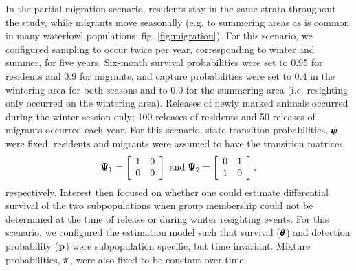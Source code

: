 \documentclass[times,mee,doublespace,]{besauth2}
\begin{document}
In the partial migration scenario, residents stay in the same strata throughout the study, while migrants move seasonally (e.g. to summering areas as is common in many waterfowl populations; fig. \ref{fig:migration}).  For this scenario, we configured sampling to occur twice per year, corresponding to winter and summer, for five years.  Six-month survival probabilities were set to 0.95 for residents and 0.9 for migrants, and capture probabilities were set to 0.4 in the wintering area for both seasons and to 0.0 for the summering area (i.e. resighting only occurred on the wintering area).  Releases of newly marked animals occurred during the winter session only; 100 releases of residents and 50 releases of migrants occurred each year.  For this scenario, state transition probabilities, $\pmb{\psi}$, were fixed; residents and migrants were assumed to have the transition matrices
\begin{eqnarray*}
  \pmb{\Psi}_1 = \left[ \begin{array}{cc} 1 & 0 \\ 0 & 0 \end{array} \right] 
  \text{  and  } \pmb{\Psi}_2 = \left[ \begin{array}{cc} 0 & 1 \\ 1 & 0 \end{array} \right], 
\end{eqnarray*}
respectively.  Interest then focused on whether one could estimate differential survival of the two subpopulations when group membership could not be determined at the time of release or during winter resighting events.  For this scenario, we configured the estimation model such that survival ($\pmb{\theta}$) and detection probability (${\bf p}$) were subpopulation specific, but time invariant.  Mixture probabilities, $\pmb{\pi}$, were also fixed to be constant over time.
\end{document}

